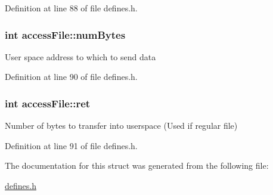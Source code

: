 Definition at line 88 of file defines.\-h.

\hypertarget{structaccess_file_a88da95f58ee0db9eff5d9fae8d94585f}{
\subsubsection[{num\-Bytes}]{\setlength{\rightskip}{0pt plus 5cm}int access\-File\-::num\-Bytes}}\label{structaccess_file_a88da95f58ee0db9eff5d9fae8d94585f}
User space address to which to send data 

Definition at line 90 of file defines.\-h.

\hypertarget{structaccess_file_af78cfca94c3c5287dd6b843953eb1052}{
\subsubsection[{ret}]{\setlength{\rightskip}{0pt plus 5cm}int access\-File\-::ret}}\label{structaccess_file_af78cfca94c3c5287dd6b843953eb1052}
Number of bytes to transfer into userspace (Used if regular file) 

Definition at line 91 of file defines.\-h.



The documentation for this struct was generated from the following file\-:\begin{DoxyCompactItemize}
\item 
\hyperlink{defines_8h}{defines.\-h}\end{DoxyCompactItemize}
